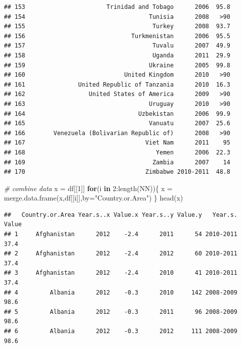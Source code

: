 \documentclass[
]{book}
\newenvironment{Shaded}{\begin{snugshade}}{\end{snugshade}}
\newcommand{\AttributeTok}[1]{\textcolor[rgb]{0.77,0.63,0.00}{#1}}
\newcommand{\CommentTok}[1]{\textcolor[rgb]{0.56,0.35,0.01}{\textit{#1}}}
\newcommand{\ControlFlowTok}[1]{\textcolor[rgb]{0.13,0.29,0.53}{\textbf{#1}}}
\newcommand{\DecValTok}[1]{\textcolor[rgb]{0.00,0.00,0.81}{#1}}
\newcommand{\FunctionTok}[1]{\textcolor[rgb]{0.00,0.00,0.00}{#1}}
\newcommand{\NormalTok}[1]{#1}
\newcommand{\OtherTok}[1]{\textcolor[rgb]{0.56,0.35,0.01}{#1}}
\newcommand{\SpecialCharTok}[1]{\textcolor[rgb]{0.00,0.00,0.00}{#1}}
\newcommand{\StringTok}[1]{\textcolor[rgb]{0.31,0.60,0.02}{#1}}
\begin{document}
\begin{verbatim}
## 153                       Trinidad and Tobago      2006  95.8
## 154                                   Tunisia      2008   >90
## 155                                    Turkey      2008  93.7
## 156                              Turkmenistan      2006  95.5
## 157                                    Tuvalu      2007  49.9
## 158                                    Uganda      2011  29.9
## 159                                   Ukraine      2005  99.8
## 160                            United Kingdom      2010   >90
## 161               United Republic of Tanzania      2010  16.3
## 162                  United States of America      2009   >90
## 163                                   Uruguay      2010   >90
## 164                                Uzbekistan      2006  99.9
## 165                                   Vanuatu      2007  25.6
## 166        Venezuela (Bolivarian Republic of)      2008   >90
## 167                                  Viet Nam      2011    95
## 168                                     Yemen      2006  22.3
## 169                                    Zambia      2007    14
## 170                                  Zimbabwe 2010-2011  48.8
\end{verbatim}

\begin{Shaded}
\begin{Highlighting}[]
\CommentTok{\# combine data}
\NormalTok{x }\OtherTok{=}\NormalTok{ df[[}\DecValTok{1}\NormalTok{]]}
\ControlFlowTok{for}\NormalTok{(i }\ControlFlowTok{in} \DecValTok{2}\SpecialCharTok{:}\FunctionTok{length}\NormalTok{(NN))\{}
\NormalTok{  x }\OtherTok{=} \FunctionTok{merge.data.frame}\NormalTok{(x,df[[i]],}\AttributeTok{by=}\StringTok{"Country.or.Area"}\NormalTok{)}
\NormalTok{\}}
\FunctionTok{head}\NormalTok{(x)}
\end{Highlighting}
\end{Shaded}

\begin{verbatim}
##   Country.or.Area Year.s..x Value.x Year.s..y Value.y   Year.s. Value
## 1     Afghanistan      2012    -2.4      2011      54 2010-2011  37.4
## 2     Afghanistan      2012    -2.4      2012      60 2010-2011  37.4
## 3     Afghanistan      2012    -2.4      2010      41 2010-2011  37.4
## 4         Albania      2012    -0.3      2010     142 2008-2009  98.6
## 5         Albania      2012    -0.3      2011      96 2008-2009  98.6
## 6         Albania      2012    -0.3      2012     111 2008-2009  98.6
\end{verbatim}
\end{document}
